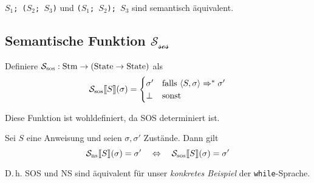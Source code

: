 \par\medskip
\begin{example}
    \texttt{$S_1$; ($S_2$; $S_3$)} und \texttt{($S_1$; $S_2$); $S_3$} sind semantisch äquivalent.
\end{example}



\subsection{Semantische Funktion $\mathcal{S_{\text{sos}}}$}

\begin{definition}
    Definiere $\mathcal{S_{\text{sos}}}: \operatorname{Stm} \to (\operatorname{State} \to \operatorname{State})$ als
    \[
        \mathcal{S_{\text{sos}}}\mathrm{[}\kern-.14em\mathrm{[} S \mathrm{]}\kern-.14em\mathrm{]}(\sigma) = \begin{cases}
            \sigma' & \text{falls } \langle S, \sigma \rangle \Rightarrow^* \sigma' \\
            \bot & \text{sonst}
        \end{cases}
    \]

    Diese Funktion ist wohldefiniert, da SOS determiniert ist.
\end{definition}

\begin{theorem}
    Sei $S$ eine Anweisung und seien $\sigma, \sigma'$ Zustände. Dann gilt
    \[
        \mathcal{S_{\text{ns}}}\mathrm{[}\kern-.14em\mathrm{[} S \mathrm{]}\kern-.14em\mathrm{]}(\sigma) = \sigma'
        \quad\Leftrightarrow\quad
        \mathcal{S_{\text{sos}}}\mathrm{[}\kern-.14em\mathrm{[} S \mathrm{]}\kern-.14em\mathrm{]}(\sigma) = \sigma'
    \]

    D.\,h. SOS und NS sind äquivalent für unser \emph{konkretes Beispiel} der \texttt{while}-Sprache.
\end{theorem}

